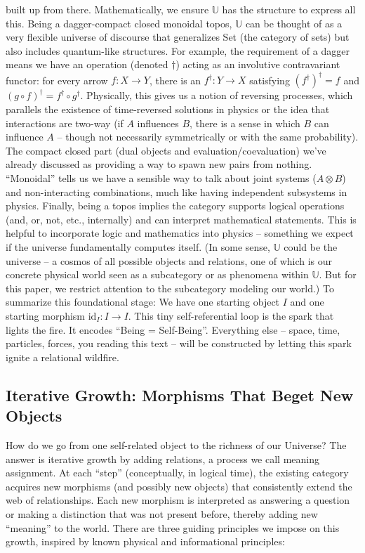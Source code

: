 \documentclass{article}
\begin{document}
built up from there. Mathematically, we ensure $\mathbb{U}$ has the structure to express all this. Being a dagger-compact closed monoidal topos, $\mathbb{U}$ can be thought of as a very flexible universe of discourse that generalizes Set (the category of sets) but also includes quantum-like structures. For example, the requirement of a dagger means we have an operation (denoted $\dagger$) acting as an involutive contravariant functor: for every arrow $f: X \to Y$, there is an $f^\dagger: Y \to X$ satisfying $(f^\dagger)^\dagger = f$ and $(g\circ f)^\dagger = f^\dagger \circ g^\dagger$. Physically, this gives us a notion of reversing processes, which parallels the existence of time-reversed solutions in physics or the idea that interactions are two-way (if $A$ influences $B$, there is a sense in which $B$ can influence $A$ – though not necessarily symmetrically or with the same probability). The compact closed part (dual objects and evaluation/coevaluation) we’ve already discussed as providing a way to spawn new pairs from nothing. “Monoidal” tells us we have a sensible way to talk about joint systems ($A \otimes B$) and non-interacting combinations, much like having independent subsystems in physics. Finally, being a topos implies the category supports logical operations (and, or, not, etc., internally) and can interpret mathematical statements. This is helpful to incorporate logic and mathematics into physics – something we expect if the universe fundamentally computes itself. (In some sense, $\mathbb{U}$ could be the universe – a cosmos of all possible objects and relations, one of which is our concrete physical world seen as a subcategory or as phenomena within $\mathbb{U}$. But for this paper, we restrict attention to the subcategory modeling our world.) To summarize this foundational stage: We have one starting object $I$ and one starting morphism $\mathrm{id}_I: I \to I$. This tiny self-referential loop is the spark that lights the fire. It encodes “Being = Self-Being”. Everything else – space, time, particles, forces, you reading this text – will be constructed by letting this spark ignite a relational wildfire.

\subsection{Iterative Growth: Morphisms That Beget New Objects}

How do we go from one self-related object to the richness of our Universe? The answer is iterative growth by adding relations, a process we call meaning assignment. At each “step” (conceptually, in logical time), the existing category acquires new morphisms (and possibly new objects) that consistently extend the web of relationships. Each new morphism is interpreted as answering a question or making a distinction that was not present before, thereby adding new “meaning” to the world. There are three guiding principles we impose on this growth, inspired by known physical and informational principles:
\end{document}
